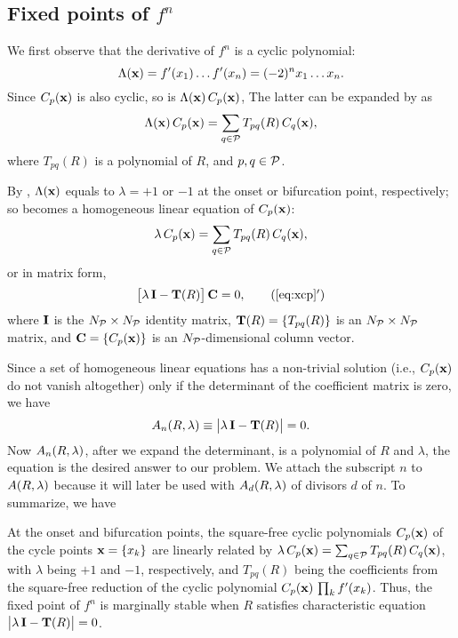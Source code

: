 \documentclass{ws-ijbc}
\begin{document}
\subsection{\label{sec:algo}Fixed points of $f^n$}


We first observe that the derivative of $f^n$
is a cyclic polynomial:
%
%
\begin{equation}
  \Lambda(\mathbf{x})
   = f'(x_1) \dots f'(x_n)
   = (-2)^n x_1 \dots x_n.
\label{eq:logder}
\end{equation}
%
%
Since $C_p(\mathbf{x})$ is also cyclic,
  so is $\Lambda(\mathbf{x}) \, C_p(\mathbf{x})$,
The latter can be expanded by  as
\begin{equation}
  \Lambda(\mathbf{x}) \, C_p(\mathbf{x}) = \sum_{q \in \mathcal P} T_{pq}(R) \, C_q(\mathbf{x}),
\label{eq:xcp0}
\end{equation}
where $T_{pq}(R)$ is a polynomial of $R$,
and $p, q \in \mathcal P$.



By ,
  $\Lambda(\mathbf{x})$ equals to $\lambda = +1$ or $-1$
  at the onset or bifurcation point,
  respectively;
  so 
  becomes a homogeneous linear equation of
  $C_p(\mathbf{x})$:
\begin{equation}
  \lambda \, C_p(\mathbf{x}) = \sum_{q \in \mathcal P} T_{pq}(R) \, C_q(\mathbf{x}),
\label{eq:xcp}
\end{equation}
%
%
or in matrix form,
\begin{equation}
  \big[ \lambda \, \vct I - \vct T(R) \big] \, \vct C = 0,
\tag{\ref{eq:xcp}$'$}
\end{equation}
%
%
where
$\mathbf{I}$ is the $N_\mathcal P \times N_\mathcal P$ identity matrix,
$\mathbf{T}(R) = \{T_{pq}(R)\}$ is an $N_\mathcal P \times N_\mathcal P$ matrix,
and
$\mathbf{C} = \{C_p(\mathbf{x})\}$ is an $N_\mathcal P$-dimensional column vector.




Since a set of homogeneous linear equations
  has a non-trivial solution
  (i.e., $C_p(\mathbf{x})$ do not vanish altogether)
  only if the determinant of the coefficient matrix
  is zero, we have
\begin{equation}
  A_n(R, \lambda) \equiv \big| \lambda \, \mathbf{I} - \mathbf{T}(R) \big| = 0.
\label{eq:xr}
\end{equation}
%
Now $A_n(R, \lambda)$, after we expand the determinant,
  is a polynomial of $R$ and $\lambda$,
  the equation is the desired answer to our problem.
%
We attach the subscript $n$ to $A(R, \lambda)$ because
  it will later be used with $A_d(R, \lambda)$ of divisors $d$ of $n$.
%
To summarize, we have
\begin{theorem}
  At the onset and bifurcation points,
  the square-free cyclic polynomials $C_p(\mathbf{x})$
  of the cycle points $\mathbf{x} = \{x_k\}$
  are linearly related by %
  $\lambda \, C_p(\mathbf{x}) = \sum_{q \in \mathcal P} T_{pq}(R) \, C_q(\mathbf{x})$,
  with $\lambda$ being $+1$ and $-1$, respectively,
  and $T_{pq}(R)$ being the coefficients
  from the square-free reduction of the cyclic polynomial
  $C_p(\mathbf{x}) \, \prod_k f'(x_k)$. %
  Thus, the fixed point of $f^n$
  is marginally stable when $R$ satisfies
  characteristic equation $\big| \lambda \, \mathbf{I} - \mathbf{T}(R) \big| = 0$.
  \label{thm:main}
\end{theorem}
\end{document}
